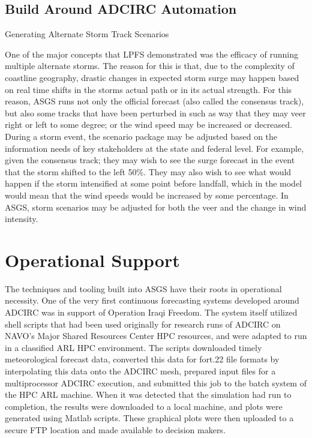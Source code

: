 \documentclass{article}
\begin{document}
\subsection{Build Around ADCIRC Automation}

Generating Alternate Storm Track Scenarios

One of the major concepts that LPFS demonstrated was the efficacy of running
multiple alternate storms. The reason for this is that, due to the complexity of
coastline geography, drastic changes in expected storm surge may happen based on
real time shifts in the storms actual path or in its actual strength. For this
reason, ASGS runs not only the official forecast (also called the consensus
track), but also some tracks that have been perturbed in such as way that they
may veer right or left to some degree; or the wind speed may be increased or
decreased.  During a storm event, the scenario package may be adjusted based on
the information needs of key stakeholders at the state and federal level. For
example, given the consensus track; they may wish to see the surge forecast in
the event that the storm shifted to the left 50\%. They may also wish to see
what would happen if the storm intensified at some point before landfall, which
in the model would mean that the wind speeds would be increased by some
percentage. In ASGS, storm scenarios may be adjusted for both the veer and the
change in wind intensity.

\section{Operational Support}

The techniques and tooling built into ASGS have their roots in operational
necessity. One of the very first continuous forecasting systems developed around
ADCIRC was in support of Operation Iraqi Freedom\cite{}. The system itself
utilized shell scripts that had been used originally for research runs of ADCIRC
on NAVO's Major Shared Resources Center HPC resources, and were adapted to run
in a classified ARL HPC environment. The scripts downloaded timely
meteorological forecast data, converted this data for fort.22 file formats by
interpolating this data onto the ADCIRC mesh, prepared input files for a
multiprocessor ADCIRC execution, and submitted this job to the batch system of
the HPC ARL machine. When it was detected that the simulation had run to
completion, the results were downloaded to a local machine, and plots were
generated using Matlab scripts. These graphical plots were then uploaded to a
secure FTP location and made available to decision makers.
\end{document}

